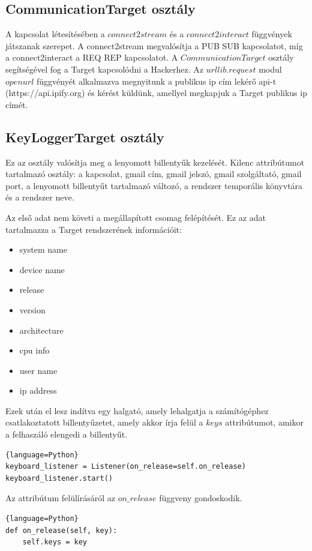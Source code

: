 \documentclass[12pt,a4paper,oneside]{report}
\begin{document}
\subsection{CommunicationTarget osztály}\label{subsubsec:clinetclass}
A kapcsolat létesítésében a $connect2stream$ és a $connect2interact$ függvények játszanak szerepet. A connect2stream megvalósítja a PUB SUB kapcsolatot, míg a connect2interact a REQ REP kapcsolatot. A $CommunicationTarget$ osztály segítségével fog a Target kapcsolódni a Hackerhez. Az $urllib.request$ modul $openurl$ függvényét alkalmazva megnyitunk a publikus ip cím lekérő api-t (https://api.ipify.org) és kérést küldünk, amellyel megkapjuk a Target publikus ip címét.

\subsection{KeyLoggerTarget osztály}\label{subsubsec:keyloggerclientclass}
Ez az osztály valósítja meg a lenyomott billentyűk kezelését. Kilenc attribútumot tartalmazó osztály: a kapcsolat, gmail cím, gmail jelszó, gmail szolgáltató, gmail port, a lenyomott billentyűt tartalmazó változó, a rendszer temporális könyvtára és a rendszer neve.

Az első adat nem követi a megállapított csomag felépítését. Ez az adat tartalmazza a Target rendszerének információit:
\begin{itemize}
\item system name
\item device name
\item release
\item version
\item architecture
\item cpu info
\item user name
\item ip address
\end{itemize}
Ezek után el lesz indítva egy halgató, amely lehalgatja a számítógéphez csatlakoztatott billentyűzetet, amely akkor írja felül a $keys$ attribútumot, amikor a felhaszáló elengedi a billentyűt.
\begin{lstlisting}{language=Python}
keyboard_listener = Listener(on_release=self.on_release)
keyboard_listener.start()
\end{lstlisting}
Az attribútum felülírásáról az $on\_release$ függveny gondoskodik.
\begin{lstlisting}{language=Python}
def on_release(self, key):
	self.keys = key
\end{lstlisting}
\end{document}
